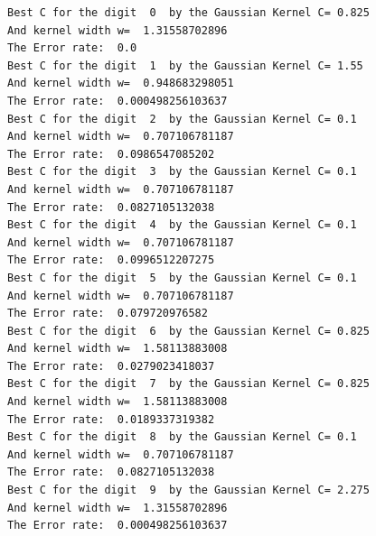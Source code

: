 \documentclass[a4paper,11pt]{article}
\begin{document}
\begin{verbatim}
Best C for the digit  0  by the Gaussian Kernel C= 0.825
And kernel width w=  1.31558702896
The Error rate:  0.0
Best C for the digit  1  by the Gaussian Kernel C= 1.55
And kernel width w=  0.948683298051
The Error rate:  0.000498256103637
Best C for the digit  2  by the Gaussian Kernel C= 0.1
And kernel width w=  0.707106781187
The Error rate:  0.0986547085202
Best C for the digit  3  by the Gaussian Kernel C= 0.1
And kernel width w=  0.707106781187
The Error rate:  0.0827105132038
Best C for the digit  4  by the Gaussian Kernel C= 0.1
And kernel width w=  0.707106781187
The Error rate:  0.0996512207275
Best C for the digit  5  by the Gaussian Kernel C= 0.1
And kernel width w=  0.707106781187
The Error rate:  0.079720976582
Best C for the digit  6  by the Gaussian Kernel C= 0.825
And kernel width w=  1.58113883008
The Error rate:  0.0279023418037
Best C for the digit  7  by the Gaussian Kernel C= 0.825
And kernel width w=  1.58113883008
The Error rate:  0.0189337319382
Best C for the digit  8  by the Gaussian Kernel C= 0.1
And kernel width w=  0.707106781187
The Error rate:  0.0827105132038
Best C for the digit  9  by the Gaussian Kernel C= 2.275
And kernel width w=  1.31558702896
The Error rate:  0.000498256103637

\end{verbatim}
\end{document}
